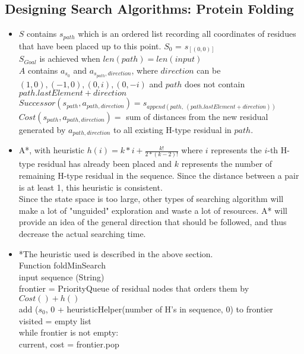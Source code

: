 \documentclass[11pt]{article}
\begin{document}
\begin{onehalfspace}
    \section{Designing Search Algorithms: Protein Folding}
    \begin{itemize}
    \item
    $S$ contains $s_{path}$ which is an ordered list recording all coordinates of residues that have been placed up to this point.
    $S_0$ = $s_{[(0, 0)]}$ \\
    $S_{Goal}$ is achieved when $len(path) = len(input)$ \\
    $A$ contains $a_{s_0}$ and $a_{s_{path}, direction}$, where $direction$ can be $(1, 0), (-1, 0), (0, i), (0, -i)$ and $path$ does not contain $path.lastElement + direction$ \\
    $Successor(s_{path}, a_{path, direction}) = s_{append(path,\: (path.lastElement + direction))}$ \\
    $Cost(s_{path}, a_{path, direction}) =$ sum of distances from the new residual generated by $a_{path, direction}$ to all existing H-type residual in $path$.
    \item
    A*, with heuristic $h(i) = k * i + \frac{k!}{2 * (k-2)!}$ where $i$ represents the $i$-th H-type residual has already been placed and $k$ represents the number of remaining H-type residual in the sequence. Since the distance between a pair is at least 1, this heuristic is consistent.\\
    Since the state space is too large, other types of searching algorithm will make a lot of "unguided" exploration and waste a lot of resources. A* will provide an idea of the general direction that should be followed, and thus decrease the actual searching time.
    \item
    \newcommand\tab[1][1cm]{\hspace*{#1}}
    *The heuristic used is described in the above section.\\
    Function foldMinSearch \\
    \tab input sequence (String) \\
    \tab frontier = PriorityQueue of residual nodes that orders them by $Cost() + h()$ \\
    \tab add ($s_0$, 0 + heuristicHelper(number of H's in sequence, 0) to frontier\\
    \tab visited = empty list\\
    \tab while frontier is not empty: \\
    \tab\tab current, cost = frontier.pop \\

\end{itemize}
\end{onehalfspace}
\end{document}
